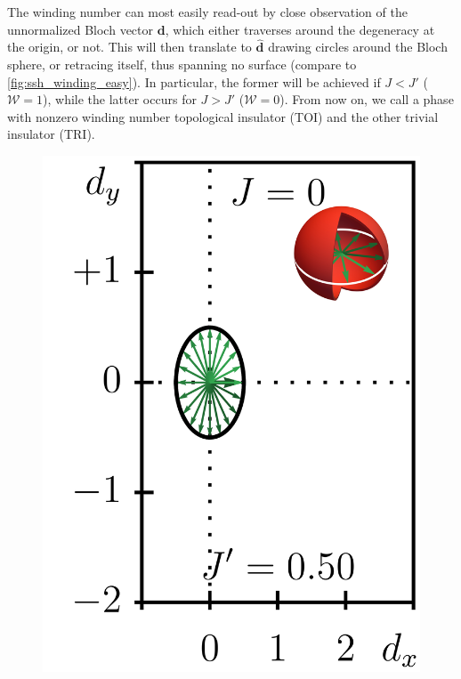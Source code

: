 The winding number can most easily read-out by close observation of the unnormalized Bloch vector ${\bm d}$, which either traverses around the degeneracy at the origin, or not.
This will then translate to $\hat{\bm d}$ drawing circles around the Bloch sphere, or retracing itself, thus spanning no surface (compare to \cref{fig:ssh_winding_easy}).
In particular, the former will be achieved if $J<J'$ ($\mathcal W=1$), while the latter occurs for $J>J'$ ($\mathcal W=0$).
From now on, we call a phase with nonzero winding number topological insulator (TOI) and the other trivial insulator (TRI).
\begin{figure}[ht]
    \centering
    \includegraphics{figures/ssh_unnormalized_winding_2.png}

\end{figure}

